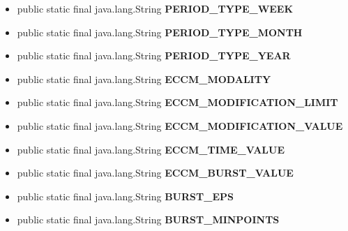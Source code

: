 {{{{{{{{{\begin{itemize}
{}
\item{
\label{it.unisa.sesa.repominer.preferences.PreferenceConstants.PERIOD_TYPE_WEEK}\hypertarget{it.unisa.sesa.repominer.preferences.PreferenceConstants.PERIOD_TYPE_WEEK}{public static final java.lang.String {\bf  PERIOD\_TYPE\_WEEK}}
}
\item{
\label{it.unisa.sesa.repominer.preferences.PreferenceConstants.PERIOD_TYPE_MONTH}\hypertarget{it.unisa.sesa.repominer.preferences.PreferenceConstants.PERIOD_TYPE_MONTH}{public static final java.lang.String {\bf  PERIOD\_TYPE\_MONTH}}
}
\item{
\label{it.unisa.sesa.repominer.preferences.PreferenceConstants.PERIOD_TYPE_YEAR}\hypertarget{it.unisa.sesa.repominer.preferences.PreferenceConstants.PERIOD_TYPE_YEAR}{public static final java.lang.String {\bf  PERIOD\_TYPE\_YEAR}}
}
\item{
\label{it.unisa.sesa.repominer.preferences.PreferenceConstants.ECCM_MODALITY}\hypertarget{it.unisa.sesa.repominer.preferences.PreferenceConstants.ECCM_MODALITY}{public static final java.lang.String {\bf  ECCM\_MODALITY}}
}
\item{
\label{it.unisa.sesa.repominer.preferences.PreferenceConstants.ECCM_MODIFICATION_LIMIT}\hypertarget{it.unisa.sesa.repominer.preferences.PreferenceConstants.ECCM_MODIFICATION_LIMIT}{public static final java.lang.String {\bf  ECCM\_MODIFICATION\_LIMIT}}
}
\item{
\label{it.unisa.sesa.repominer.preferences.PreferenceConstants.ECCM_MODIFICATION_VALUE}\hypertarget{it.unisa.sesa.repominer.preferences.PreferenceConstants.ECCM_MODIFICATION_VALUE}{public static final java.lang.String {\bf  ECCM\_MODIFICATION\_VALUE}}
}
\item{
\label{it.unisa.sesa.repominer.preferences.PreferenceConstants.ECCM_TIME_VALUE}\hypertarget{it.unisa.sesa.repominer.preferences.PreferenceConstants.ECCM_TIME_VALUE}{public static final java.lang.String {\bf  ECCM\_TIME\_VALUE}}
}
\item{
\label{it.unisa.sesa.repominer.preferences.PreferenceConstants.ECCM_BURST_VALUE}\hypertarget{it.unisa.sesa.repominer.preferences.PreferenceConstants.ECCM_BURST_VALUE}{public static final java.lang.String {\bf  ECCM\_BURST\_VALUE}}
}
\item{
\label{it.unisa.sesa.repominer.preferences.PreferenceConstants.BURST_EPS}\hypertarget{it.unisa.sesa.repominer.preferences.PreferenceConstants.BURST_EPS}{public static final java.lang.String {\bf  BURST\_EPS}}
}
\item{
\label{it.unisa.sesa.repominer.preferences.PreferenceConstants.BURST_MINPOINTS}\hypertarget{it.unisa.sesa.repominer.preferences.PreferenceConstants.BURST_MINPOINTS}{public static final java.lang.String {\bf  BURST\_MINPOINTS}}
}
\end{itemize}
}
}}}}}}}}
